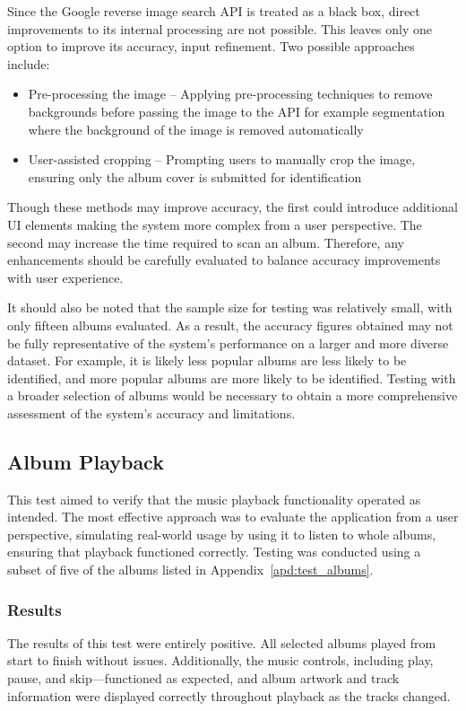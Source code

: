 Since the Google reverse image search API is treated as a black box, direct improvements to its internal processing are not possible. This leaves only one option to improve its accuracy, input refinement. Two possible approaches include:

\begin{itemize}
    \item Pre-processing the image – Applying pre-processing techniques to remove backgrounds before passing the image to the API for example segmentation where the background of the image is removed automatically %
    \item User-assisted cropping – Prompting users to manually crop the image, ensuring only the album cover is submitted for identification
\end{itemize}

Though these methods may improve accuracy, the first could introduce additional UI elements making the system more complex from a user perspective. The second may increase the time required to scan an album. Therefore, any enhancements should be carefully evaluated to balance accuracy improvements with user experience.

It should also be noted that the sample size for testing was relatively small, with only fifteen albums evaluated. As a result, the accuracy figures obtained may not be fully representative of the system's performance on a larger and more diverse dataset. For example, it is likely less popular albums are less likely to be identified, and more popular albums are more likely to be identified. Testing with a broader selection of albums would be necessary to obtain a more comprehensive assessment of the system’s accuracy and limitations.

\subsection{Album Playback}
This test aimed to verify that the music playback functionality operated as intended. The most effective approach was to evaluate the application from a user perspective, simulating real-world usage by using it to listen to whole albums, ensuring that playback functioned correctly.
\ifshowappendix
Testing was conducted using a subset of five of the albums listed in Appendix~\ref{apd:test_albums}.
\fi

\subsubsection{Results}
The results of this test were entirely positive. All selected albums played from start to finish without issues. Additionally, the music controls, including play, pause, and skip—functioned as expected, and album artwork and track information were displayed correctly throughout playback as the tracks changed.

